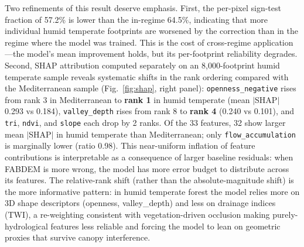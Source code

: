 \documentclass[preprint,authoryear,number]{elsarticle}
\begin{document}
Two refinements of this result deserve emphasis. First, the per-pixel sign-test fraction of 57.2\% is lower than the in-regime 64.5\%, indicating that more individual humid temperate footprints are worsened by the correction than in the regime where the model was trained. This is the cost of cross-regime application---the model's mean improvement holds, but its per-footprint reliability degrades. Second, SHAP attribution computed separately on an 8{,}000-footprint humid temperate sample reveals systematic shifts in the rank ordering compared with the Mediterranean sample (Fig.~\ref{fig:shap}, right panel): \texttt{openness\_negative} rises from rank 3 in Mediterranean to \textbf{rank 1} in humid temperate (mean $|$SHAP$|$ 0.293 vs 0.184), \texttt{valley\_depth} rises from rank 8 to \textbf{rank 4} (0.240 vs 0.101), and \texttt{tri}, \texttt{ndvi}, and \texttt{slope} each drop by 2 ranks. Of the 33 features, 32 show larger mean $|$SHAP$|$ in humid temperate than Mediterranean; only \texttt{flow\_accumulation} is marginally lower (ratio 0.98). This near-uniform inflation of feature contributions is interpretable as a consequence of larger baseline residuals: when FABDEM is more wrong, the model has more error budget to distribute across its features. The relative-rank shift (rather than the absolute-magnitude shift) is the more informative pattern: in humid temperate forest the model relies more on 3D shape descriptors (openness, valley\_depth) and less on drainage indices (TWI), a re-weighting consistent with vegetation-driven occlusion making purely-hydrological features less reliable and forcing the model to lean on geometric proxies that survive canopy interference.
\end{document}
